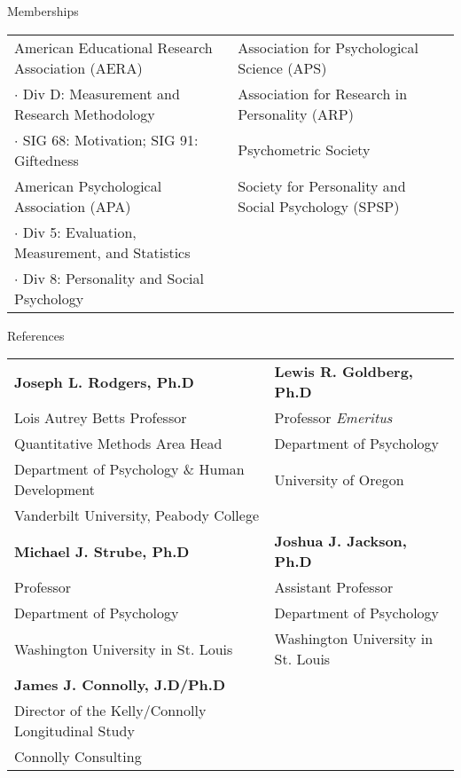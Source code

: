 \documentclass {resume}
\begin{document}
\begin{samepage}\begin{rSection}{\textrm{Memberships}}
\begin{tabular}{ l l }
American Educational Research Association (AERA)& Association for Psychological Science (APS) \\
$\cdot$ {\small Div D: Measurement and Research Methodology} &  Association for Research in Personality (ARP)\\
$\cdot$ {\small SIG 68: Motivation; SIG 91: Giftedness}& Psychometric Society\\
American Psychological Association (APA) & Society for Personality and Social Psychology (SPSP)\\
$\cdot$ {\small Div 5: Evaluation, Measurement, and Statistics}
\\
$\cdot$ {\small Div 8: Personality and Social Psychology} \\
\end{tabular}
\end{rSection}\end{samepage}

\begin{samepage}\begin{rSection}{\textrm{References}}
\begin{tabular}{ l l }
\textbf{Joseph L. Rodgers, Ph.D} & \textbf{Lewis R. Goldberg, Ph.D}\\Lois Autrey Betts Professor & Professor \textit{Emeritus}\\
Quantitative Methods Area Head & Department of Psychology\\
Department of Psychology $\&$ Human Development & University of Oregon\\
Vanderbilt University, Peabody College & \bigskip\\

\textbf{Michael J. Strube, Ph.D} & \textbf{Joshua J. Jackson, Ph.D}\\
Professor & Assistant Professor\\
Department of Psychology & Department of Psychology\\
Washington University in St. Louis & Washington University in St. Louis\bigskip\\
\textbf{James J. Connolly, J.D/Ph.D} 
\\
Director of the Kelly/Connolly Longitudinal Study\\ 
Connolly Consulting\\\end{tabular}
\end{rSection}\end{samepage}

\end{document}
